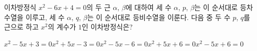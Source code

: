 이차방정식 $x^2-6x+4=0$의 두 근 $\alpha$, $\beta$에 대하여 세 수 $\alpha$, $p$, $\beta$는 이 순서대로 등차수열을 이루고, 세 수 $\alpha$, $q$, $\beta$는 이 순서대로 등비수열을 이룬다. 다음 중 두 수 $p$, $q$를 근으로 하고 $x^2$의 계수가 $1$인 이차방정식은? 
\begin{choicesii}{$x^2-5x+3=0$}{$x^2+5x-3=0$}{$x^2-5x-6=0$}{$x^2+5x+6=0$}{$x^2-5x+6=0$}\end{choicesii}
